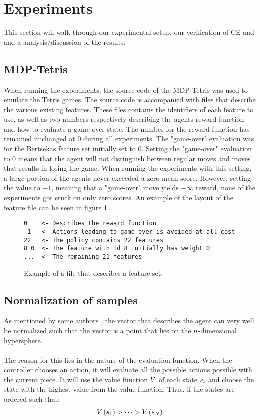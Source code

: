 \section{Experiments}

This section will walk through our experimental setup, our verification of CE and 
and a analysis/discussion of the results.

\subsection{MDP-Tetris}

When running the experiments, the source code of the MDP-Tetris
\citep{mdptetris} was used to emulate the Tetris games.
The source code is accompanied with files that describe the
various existing features. These files contains the identifiers of 
each feature to use, as well as two numbers respectively describing 
the agents reward function and how to evaluate a game over state. 
The number for the reward function has remained unchanged at $0$ 
during all experiments. The "game-over" evaluation was for the
Bertsekas feature set initially set to $0$. Setting the 
"game-over" evaluation to $0$ means that the agent will not 
distinguish between regular moves and moves that results in losing
the game. When running the experiments with this setting, a large portion
of the agents never exceeded a zero mean score. However, setting the value
to $-1$, meaning that a "game-over" move yields $-\infty$ reward, 
none of the experiments got stuck on only zero scores. An example
of the layout of the feature file can be seen in figure \ref{fig:featfile}.
\begin{figure}[h!]
\centering
\begin{lstlisting}
0    <- Describes the reward function
-1   <- Actions leading to game over is avoided at all cost
22   <- The policy contains 22 features
8 0  <- The feature with id 8 initially has weight 0
...  <- The remaining 21 features
\end{lstlisting}
\caption{Example of a file that describes a feature set. \label{fig:featfile}}
\end{figure}

 
\subsection{Normalization of samples}
As mentioned by some authors \citep{boumaza2009}, the vector that
describes the agent can very well be normalized such that the vector
is a point that lies on the $n$-dimensional hypersphere.\\
\\
The reason for this lies in the nature of the evaluation function.
When the controller chooses an action, it will evaluate all the 
possible actions possible with the current piece. It will use the 
value function $V$ of each state $s_i$ and 
choose the state with the highest value from the value function.
Thus, if the states are ordered such that:
\begin{align*}
V \left(  s_1 \right) 
> \dots 
> V \left( s_N \right)
\end{align*}

